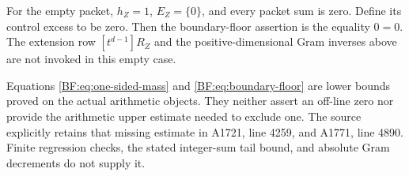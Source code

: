 For the empty packet, \(h_Z=1\), \(E_Z=\{0\}\), and every
packet sum is zero.  Define its control excess to be zero.
Then the boundary-floor assertion is the equality \(0=0\).
The extension row \([t^{d-1}]R_Z\) and the positive-dimensional
Gram inverses above are not invoked in this empty case.

Equations \eqref{BF:eq:one-sided-mass} and
\eqref{BF:eq:boundary-floor} are lower bounds proved on the
actual arithmetic objects.  They neither assert an off-line
zero nor provide the arithmetic upper estimate needed to
exclude one.  The source explicitly retains that missing
estimate in A1721, line 4259, and A1771, line 4890.
Finite regression checks, the stated integer-sum tail bound,
and absolute Gram decrements do not supply it.

